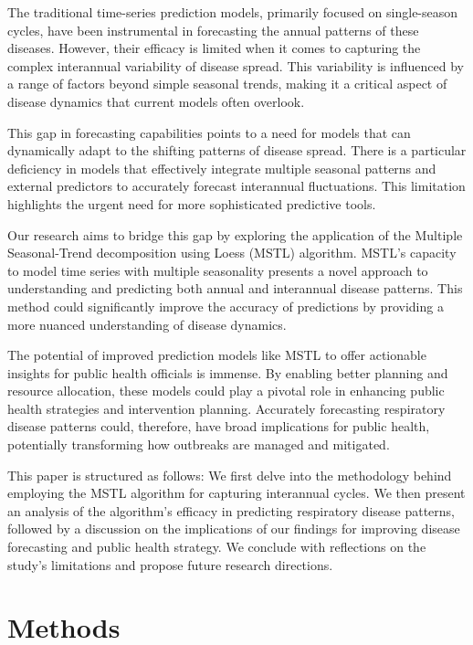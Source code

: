 \documentclass{article}
\begin{document}
The traditional time-series prediction models, primarily focused on single-season cycles, have been instrumental in forecasting the annual patterns of these diseases. However, their efficacy is limited when it comes to capturing the complex interannual variability of disease spread. This variability is influenced by a range of factors beyond simple seasonal trends, making it a critical aspect of disease dynamics that current models often overlook.

This gap in forecasting capabilities points to a need for models that can dynamically adapt to the shifting patterns of disease spread. There is a particular deficiency in models that effectively integrate multiple seasonal patterns and external predictors to accurately forecast interannual fluctuations. This limitation highlights the urgent need for more sophisticated predictive tools.

Our research aims to bridge this gap by exploring the application of the Multiple Seasonal-Trend decomposition using Loess (MSTL) algorithm. MSTL's capacity to model time series with multiple seasonality presents a novel approach to understanding and predicting both annual and interannual disease patterns. This method could significantly improve the accuracy of predictions by providing a more nuanced understanding of disease dynamics.

The potential of improved prediction models like MSTL to offer actionable insights for public health officials is immense. By enabling better planning and resource allocation, these models could play a pivotal role in enhancing public health strategies and intervention planning. Accurately forecasting respiratory disease patterns could, therefore, have broad implications for public health, potentially transforming how outbreaks are managed and mitigated.

This paper is structured as follows: We first delve into the methodology behind employing the MSTL algorithm for capturing interannual cycles. We then present an analysis of the algorithm's efficacy in predicting respiratory disease patterns, followed by a discussion on the implications of our findings for improving disease forecasting and public health strategy. We conclude with reflections on the study's limitations and propose future research directions.


\section{Methods}
\end{document}
